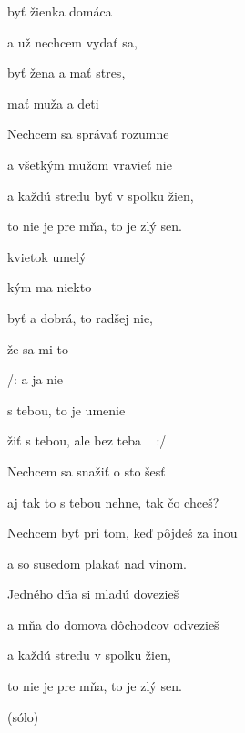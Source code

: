 

\zs
{} byť žienka domáca

a už  nechcem vydať sa,

 byť žena a mať stres,

 mať muža a deti 
\ks

\zs
Nechcem sa správať rozumne

a všetkým mužom vravieť nie

a každú stredu byť v spolku žien,

to nie je pre mňa, to je zlý sen.
\ks

\zr
{} kvietok umelý

 kým ma niekto 

byť  a dobrá, to radšej nie,

 že sa mi to 

/:  a ja nie

 s tebou, to je umenie

 žiť s tebou, ale bez teba  ~ :/
\kr

\zs
Nechcem sa snažiť o sto šesť

aj tak to s tebou nehne, tak čo chceš?

Nechcem byť pri tom, keď pôjdeš za inou

a so susedom plakať nad vínom.
\ks

\zs
Jedného dňa si mladú dovezieš

a mňa do domova dôchodcov odvezieš

a každú stredu v spolku žien,

to nie je pre mňa, to je zlý sen.
\ks

\zr \kr
(sólo)
\zr \kr
\kp
